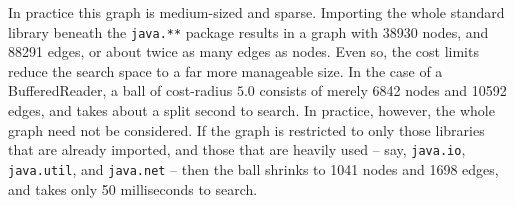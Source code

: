 In practice this graph is medium-sized and sparse. Importing the whole standard library beneath the \texttt{java.**} package results in a graph with 38930 nodes, and 88291 edges, or about twice as many edges as nodes. Even so, the cost limits reduce the search space to a far more manageable size. In the case of a BufferedReader, a ball of cost-radius $5.0$ consists of merely 6842 nodes and 10592 edges, and takes about a split second to search. In practice, however, the whole graph need not be considered. If the graph is restricted to only those libraries that are already imported, and those that are heavily used -- say, \texttt{java.io}, \texttt{java.util}, and \texttt{java.net} -- then the ball shrinks to  1041 nodes and 1698 edges, and takes only 50 milliseconds to search.
